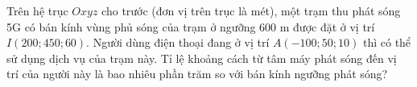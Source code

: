 \begin{bt}%

	Trên hệ trục $Oxyz$ cho trước (đơn vị trên trục là mét), một trạm thu phát sóng 5G có bán kính vùng phủ sóng của trạm ở ngưỡng $600$ m được đặt ở vị trí $I(200;450;60)$.
		Người dùng điện thoại đang ở vị trí $A(-100;50;10)$ thì có thể sử dụng dịch vụ của trạm này. Tỉ lệ khoảng cách từ tâm máy phát sóng đến vị trí của người này là bao nhiêu phần trăm so với bán kính ngưỡng phát sóng?\par
\end{bt}
